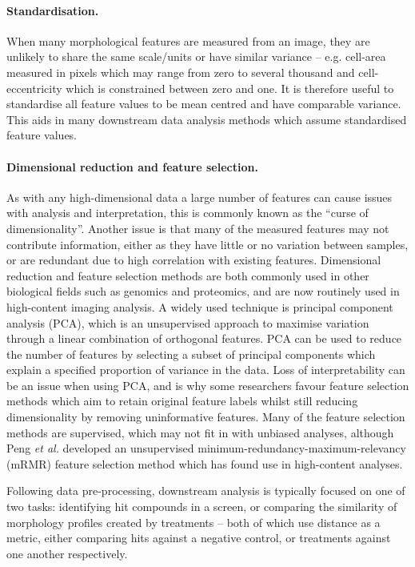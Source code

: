 \documentclass[a4paper,11pt,twoside,openright]{scrbook}
\begin{document}
\paragraph{Standardisation.}
When many morphological features are measured from an image, they are unlikely to share the same scale/units or have similar variance -- e.g. cell-area measured in pixels which may range from zero to several thousand and cell-eccentricity which is constrained between zero and one.
It is therefore useful to standardise all feature values to be mean centred and have comparable variance.
This aids in many downstream data analysis methods which assume standardised feature values.

\paragraph{Dimensional reduction and feature selection.}
As with any high-dimensional data a large number of features can cause issues with analysis and interpretation, this is commonly known as the ``curse of dimensionality''. \cite{Bellman1961}
Another issue is that many of the measured features may not contribute information, either as they have little or no variation between samples, or are redundant due to high correlation with existing features.
Dimensional reduction and feature selection methods are both commonly used in other biological fields such as genomics and proteomics, and are now routinely used in high-content imaging analysis.
A widely used technique is principal component analysis (PCA), which is an unsupervised approach to maximise variation through a linear combination of orthogonal features.
PCA can be used to reduce the number of features by selecting a subset of principal components which explain a specified proportion of variance in the data.
Loss of interpretability can be an issue when using PCA, and is why some researchers favour feature selection methods which aim to retain original feature labels whilst still reducing dimensionality by removing uninformative features.
Many of the feature selection methods are supervised, which may not fit in with unbiased analyses, although Peng \textit{et al.} developed an unsupervised minimum-redundancy-maximum-relevancy (mRMR) feature selection method which has found use in high-content analyses. \cite{Peng2005}\newline


Following data pre-processing, downstream analysis is typically focused on one of two tasks: identifying hit compounds in a screen, or comparing the similarity of morphology profiles created by treatments -- both of which use distance as a metric, either comparing hits against a negative control, or treatments against one another respectively.
\end{document}
